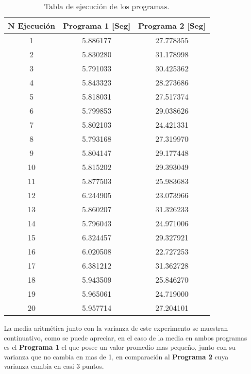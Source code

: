 \documentclass{article}
\begin{document}
\begin{table}[htbp]
    \begin{center}
    \begin{tabular}{|c|c|c|}
    \hline
    \textbf{N Ejecución} & \textbf{Programa 1 [Seg]}&\textbf{Programa 2 [Seg]}\\ \hline
    1  & 5.886177  & 27.778355      \\ \hline
    2  & 5.830280  & 31.178998  	\\ \hline
    3  & 5.791033  & 30.425362		\\ \hline
    4  & 5.843323  & 28.273686		\\ \hline
    5  & 5.818031  & 27.517374		\\ \hline
    6  & 5.799853  & 29.038626		\\ \hline
    7  & 5.802103  & 24.421331		\\ \hline
    8  & 5.793168  & 27.319970		\\ \hline
    9  & 5.804147  & 29.177448		\\ \hline
    10 & 5.815202   & 29.393049		\\ \hline
    11 & 5.877503   & 25.983683		\\ \hline
    12 & 6.244905   & 23.073966		\\ \hline
    13 & 5.860207   & 31.326233		\\ \hline
    14 & 5.796043   & 24.971006		\\ \hline
    15 & 6.324457   & 29.327921		\\ \hline
    16 & 6.020508   & 22.727253		\\ \hline
    17 & 6.381212   & 31.362728		\\ \hline
    18 & 5.943509   & 25.846270		\\ \hline
    19 & 5.965061   & 24.719000		\\ \hline
    20 & 5.957714   & 27.204101		\\ \hline
    \end{tabular}
    \caption{Tabla de ejecución de los programas.}
    \label{tabla:sencilla}
    \end{center}
\end{table}

    La media aritmética junto con la varianza de este experimento se muestran continuativo, como se puede apreciar, en el caso de la media en ambos programas es el \textbf{Programa 1} el que posee un valor promedio mas pequeño, junto con su varianza que no cambia en mas de 1, en comparación al \textbf{Programa 2} cuya varianza cambia en casi 3 puntos.
	
\end{document}
